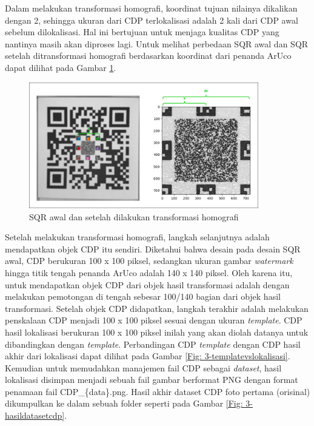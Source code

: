 Dalam melakukan transformasi homografi, koordinat tujuan nilainya dikalikan dengan 2, sehingga ukuran dari CDP terlokalisasi adalah 2 kali dari CDP awal
sebelum dilokalisasi. Hal ini bertujuan untuk menjaga kualitas CDP yang nantinya masih akan diproses lagi. Untuk melihat perbedaan SQR awal dan SQR setelah
ditransformasi homografi berdasarkan koordinat dari penanda ArUco dapat dilihat pada Gambar \ref{Fig: 3-hasillokalisasi}.

\begin{figure}[h]
	\centering
	\includegraphics[width=10cm]{contents/chapter-3/3-hasillokalisasi.png}
	\caption{SQR awal dan setelah dilakukan transformasi homografi}
	\label{Fig: 3-hasillokalisasi}
\end{figure}

Setelah melakukan transformasi homografi, langkah selanjutnya adalah mendapatkan objek CDP itu sendiri. Diketahui bahwa desain pada desain SQR awal, CDP
berukuran 100 x 100 piksel, sedangkan ukuran gambar \emph{watermark} hingga titik tengah penanda ArUco adalah 140 x 140 piksel. Oleh karena itu, untuk
mendapatkan objek CDP dari objek hasil transformasi adalah dengan melakukan pemotongan di tengah sebesar 100/140 bagian dari objek hasil transformasi. Setelah
objek CDP didapatkan, langkah terakhir adalah melakukan penskalaan CDP menjadi 100 x 100 piksel sesuai dengan ukuran \emph{template}. CDP hasil lokalisasi
berukuran 100 x 100 piksel inilah yang akan diolah datanya untuk dibandingkan dengan \emph{template}. Perbandingan CDP \emph{template} dengan CDP hasil akhir
dari lokalisasi dapat dilihat pada Gambar \ref{Fig: 3-templatevslokalisasi}. Kemudian untuk memudahkan manajemen fail CDP sebagai \emph{dataset}, hasil
lokalisasi disimpan menjadi sebuah fail gambar berformat PNG dengan format penamaan fail CDP\_\{data\}.png. Hasil akhir dataset CDP foto pertama (orisinal)
dikumpulkan ke dalam sebuah folder seperti pada Gambar \ref{Fig: 3-hasildatasetcdp}.

